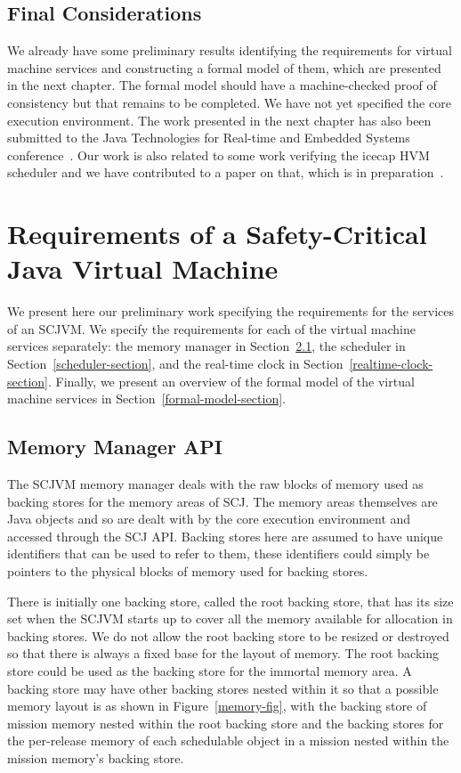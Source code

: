 \documentclass[a4paper,10pt]{report}
\begin{document}
\section{Final Considerations}

We already have some preliminary results identifying the requirements
for virtual machine services and constructing a formal model of them,
which are presented in the next chapter.
The formal model should have a machine-checked proof of consistency
but that remains to be completed.
We have not yet specified the core execution environment.
The work presented in the next chapter has also been submitted to the
Java Technologies for Real-time and Embedded Systems
conference~\cite{baxter2015submitted}.
Our work is also related to some work verifying the icecap HVM
scheduler and we have contributed to a paper on that, which is in
preparation~\cite{freitas2015inpreparation}.

\chapter{Requirements of a Safety-Critical Java Virtual Machine}
\label{requirements-chapter}

We present here our preliminary work specifying the requirements for
the services of an SCJVM.
We specify the requirements for each of the virtual machine services
separately: the memory manager in
Section~\ref{memory-manager-section}, the scheduler in
Section~\ref{scheduler-section}, and the real-time clock in
Section~\ref{realtime-clock-section}.
Finally, we present an overview of the formal model of the virtual
machine services in Section~\ref{formal-model-section}.

\section{Memory Manager API}
\label{memory-manager-section}

The SCJVM memory manager deals with the raw blocks of memory used as
backing stores for the memory areas of SCJ.
The memory areas themselves are Java objects and so are dealt with by
the core execution environment and accessed through the SCJ API.
Backing stores here are assumed to have unique identifiers that can be
used to refer to them, these identifiers could simply be pointers to
the physical blocks of memory used for backing stores.

There is initially one backing store, called the root backing store,
that has its size set when the SCJVM starts up to cover all the memory
available for allocation in backing stores.
We do not allow the root backing store to be resized or destroyed so
that there is always a fixed base for the layout of memory.
The root backing store could be used as the backing store for the
immortal memory area.
A backing store may have other backing stores nested within it so that
a possible memory layout is as shown in Figure~\ref{memory-fig}, with
the backing store of mission memory nested within the root backing
store and the backing stores for the per-release memory of each
schedulable object in a mission nested within the mission memory's
backing store.
\end{document}
